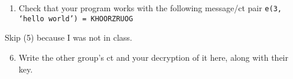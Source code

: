 \documentclass[11pt]{article}
\newcommand{\cmark}{\ding{51}}%
\newenvironment{solution}
  {\textit{Solution.}}
\newcommand{\sol}[1]{
    \begin{customframedproof}
        \begin{solution}
        #1
        \end{solution}
    \end{customframedproof}
}
\begin{document}
\begin{enumerate}

    \item	Check that your program works with the following message/ct pair
          \texttt{e(3, `hello world') = KHOORZRUOG} \cmark

\end{enumerate}
Skip (5) because I was not in class.\\
\begin{enumerate}
    \setcounter{enumi}{5}

    \item Write the other group's ct and your decryption of it here, along with their key.
          \vspace*{-0.3cm}
\end{enumerate}


\newpage
\end{document}
